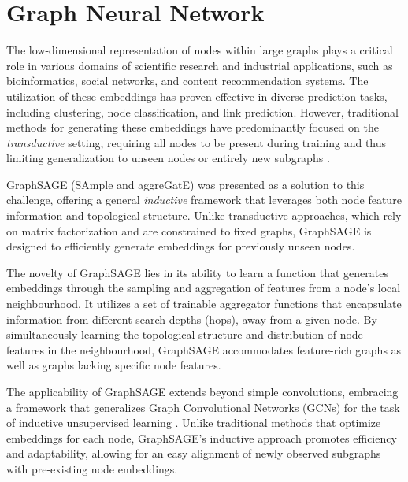 \documentclass[
11pt, %
oneside, %
english, %
singlespacing, %
headsepline, %
chapterinoneline, %
]{MastersDoctoralThesis} %
\begin{document}
\section{Graph Neural Network}\label{sec:theory:HinSAGE}
The low-dimensional representation of nodes within large graphs plays a critical role in various domains of scientific research and industrial applications, such as bioinformatics, social networks, and content recommendation systems. The utilization of these embeddings has proven effective in diverse prediction tasks, including clustering, node classification, and link prediction. However, traditional methods for generating these embeddings have predominantly focused on the \textit{transductive} setting, requiring all nodes to be present during training and thus limiting generalization to unseen nodes or entirely new subgraphs \cite{groverNode2vecScalableFeature2016, perozziDeepWalkOnlineLearning2014}.

GraphSAGE (SAmple and aggreGatE) \cite{hamiltonInductiveRepresentationLearning2017} was presented as a solution to this challenge, offering a general \textit{inductive} framework that leverages both node feature information and topological structure. Unlike transductive approaches, which rely on matrix factorization and are constrained to fixed graphs, GraphSAGE is designed to efficiently generate embeddings for previously unseen nodes.

The novelty of GraphSAGE lies in its ability to learn a function that generates embeddings through the sampling and aggregation of features from a node's local neighbourhood. It utilizes a set of trainable aggregator functions that encapsulate information from different search depths (hops), away from a given node. By simultaneously learning the topological structure and distribution of node features in the neighbourhood, GraphSAGE accommodates feature-rich graphs as well as graphs lacking specific node features.

The applicability of GraphSAGE extends beyond simple convolutions, embracing a framework that generalizes Graph Convolutional Networks (GCNs) for the task of inductive unsupervised learning \cite{kipfSemiSupervisedClassificationGraph2016}. Unlike traditional methods that optimize embeddings for each node, GraphSAGE's inductive approach promotes efficiency and adaptability, allowing for an easy alignment of newly observed subgraphs with pre-existing node embeddings.
\end{document}
